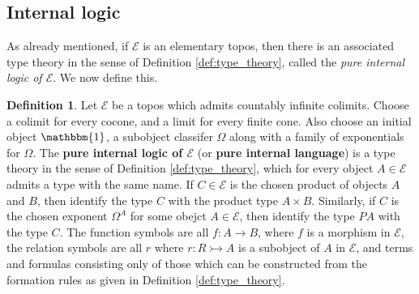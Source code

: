 \documentclass{birkjour}
\theoremstyle{plain}
\theoremstyle{definition}
\newtheorem{definition}[thm]{Definition} %
\newcommand{\call}[1]{\mathcal{#1}}
\begin{document}
	\subsection{Internal logic}
	\label{MitchellBenabou}
	As already mentioned, if $\call{E}$ is an elementary topos, then there is an associated type theory in the sense of Definition \ref{def:type_theory}, called the \emph{pure internal logic of $\call{E}$}. We now define this.
	\begin{definition}
		\label{def:internal_logic_pure}
		Let $\call{E}$ be a topos which admits countably infinite colimits. Choose a colimit for every cocone, and a limit for every finite cone. Also choose an initial object $\mathbbm{1}$, a subobject classifer $\Omega$ along with a family of exponentials for $\Omega$. The \textbf{pure internal logic of $\call{E}$} (or \textbf{pure internal language}) is a type theory in the sense of Definition \ref{def:type_theory}, which for every object $A \in \call{E}$ admits a type with the same name. If $C \in \call{E}$ is the chosen product of objects $A$ and $B$, then identify the type $C$ with the product type $A \times B$. Similarly, if $C$ is the chosen exponent $\Omega^A$ for some obejct $A \in \call{E}$, then identify the type $PA$ with the type $C$. The function symbols are all $f:A \to B$, where $f$ is a morphism in $\call{E}$, the relation symbols are all $r$ where $r: R \rightarrowtail A$ is a subobject of $A$ in $\call{E}$, and terms and formulas consisting only of those which can be constructed from the formation rules as given in Definition \ref{def:type_theory}.
	\end{definition}
	
\end{document}
